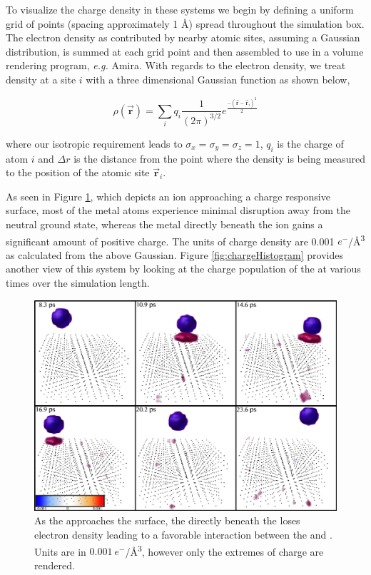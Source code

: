 To visualize the charge density in these systems we begin by defining a uniform
grid of points (spacing approximately 1 \AA) spread throughout the simulation
box. The electron density as contributed by nearby atomic sites, assuming a
Gaussian distribution, is summed at each grid point and then assembled to use in
a volume rendering program, {\em e.g.} Amira. With regards to the electron
density, we treat density at a site $i$ with a three dimensional Gaussian
function as shown below,

\begin{equation*}
\rho(\vec{\mathbf{r}}) = \sum_i q_{i} \frac{1}{(2\pi)^{3/2}}e^{\frac{-(\vec{\mathbf{r}}-\vec{\mathbf{r}}_i)^2}{2}}
\end{equation*}

where our isotropic requirement leads to $\sigma_x = \sigma_y = \sigma_z = 1$,
$q_i$ is the charge of atom $i$ and $\Delta r$ is the distance from the point
where the density is being measured to the position of the atomic site
$\vec{\mathbf{r}}_i$. 

As seen in Figure \ref{fig:chargeVol}, which depicts an  ion approaching
a charge responsive  surface, most of the metal atoms experience minimal
disruption away from the neutral ground state, whereas the metal directly
beneath the  ion gains a significant amount of positive charge. The
units of charge density are 0.001 $e^-$/\AA\textsuperscript{3} as calculated from the
above Gaussian. Figure \ref{fig:chargeHistogram} provides another view of this
system by looking at the charge population of the  at various times over
the simulation length.

\begin{landscape}
\begin{figure}
  \centering
  \includegraphics[width=0.7\linewidth]{../figures/chap5/PtOChargeVolume.pdf}
  \caption{As the  approaches the surface, the  directly beneath
the  loses electron density leading to a favorable interaction between
the  and . Units are in $0.001\ e^-$/\AA\textsuperscript{3},
however only the extremes of charge are rendered.}
\label{fig:chargeVol}
\end{figure}
\end{landscape}

